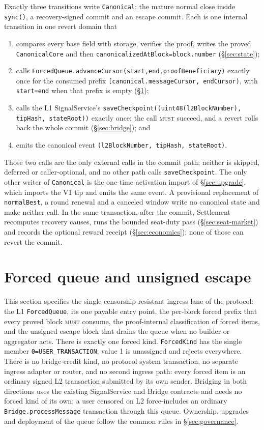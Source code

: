 \documentclass[a4paper,11pt]{article}
\newcommand{\code}[1]{\nolinkurl{#1}}
\newcommand{\must}{\textsc{must}}
\begin{document}
Exactly three transitions write \code{Canonical}: the mature normal close
inside \code{sync()}, a recovery-signed commit and an escape commit.  Each is
one internal transition in one revert domain that
\begin{enumerate}
\item compares every base field with storage, verifies the proof, writes the
proved \code{CanonicalCore} and then \code{canonicalizedAtBlock=block.number}
(\S\ref{sec:state});
\item calls \code{ForcedQueue.advanceCursor(start,end,proofBeneficiary)}
exactly once for the consumed prefix
\code{[canonical.messageCursor, endCursor)}, with \code{start=end} when that
prefix is empty (\S\ref{sec:escape});
\item calls the L1 SignalService's
\code{saveCheckpoint((uint48(l2BlockNumber), tipHash, stateRoot))}
exactly once; the call \must{} succeed, and a revert rolls back the whole commit
(\S\ref{sec:bridge}); and
\item emits the canonical event \code{(l2BlockNumber, tipHash, stateRoot)}.
\end{enumerate}
Those two calls are the only external calls in the commit path; neither is
skipped, deferred or caller-optional, and no other path calls
\code{saveCheckpoint}.  The only other writer of \code{Canonical} is the
one-time activation import of \S\ref{sec:upgrade}, which imports the V1 tip
and emits the same event.  A provisional replacement of \code{normalBest}, a
round renewal and a canceled window write no canonical state and make neither
call.  In the same transaction, after the commit, Settlement recomputes
recovery causes, runs the bounded seat-duty pass (\S\ref{sec:seat-market}) and
records the optional reward receipt (\S\ref{sec:economics}); none of those
can revert the commit.

\clearpage
\section{Forced queue and unsigned escape}\label{sec:escape}

This section specifies the single censorship-resistant ingress lane of the
protocol: the L1 \code{ForcedQueue}, its one payable entry point, the
per-block forced prefix that every proved block \must{} consume, the
proof-internal classification of forced items, and the unsigned escape block
that drains the queue when no builder or aggregator acts.  There is exactly
one forced kind.  \code{ForcedKind} has the single member
\code{0=USER_TRANSACTION}; value 1 is unassigned and rejects everywhere.
There is no bridge-credit kind, no protocol system transaction, no separate
ingress adapter or router, and no second ingress path: every forced item is
an ordinary signed L2 transaction submitted by its own sender.  Bridging in
both directions uses the existing SignalService and Bridge contracts and
needs no forced kind of its own; a user censored on L2 force-includes an
ordinary \code{Bridge.processMessage} transaction through this queue.
Ownership, upgrades and deployment of the queue follow the common rules in
\S\ref{sec:governance}.
\end{document}
